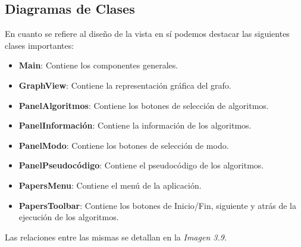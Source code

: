 \documentclass{book}
\begin{document}
\subsection{Diagramas de Clases}

En cuanto se refiere al diseño de la vista en sí podemos destacar las siguientes clases importantes:
\medskip

	\begin{itemize}
		\renewcommand{\labelitemi}{\scriptsize\tiny$\blacksquare$} 
		\itemsep=10pt \topsep=0pt \partopsep=0pt \parskip=0pt \parsep=10pt
		
		\item \textbf{Main}: Contiene los componentes generales.
		
		\item \textbf{GraphView}: Contiene la representación gráfica del grafo. 
		
		\item \textbf{PanelAlgoritmos}: Contiene los botones de selección de algoritmos.
		
		\item \textbf{PanelInformación}: Contiene la información de los algoritmos.
		
		\item \textbf{PanelModo}: Contiene los botones de selección de modo.
		
		\item \textbf{PanelPseudocódigo}: Contiene el pseudocódigo de los algoritmos.
		
		\item \textbf{PapersMenu}: Contiene el menú de la aplicación.
		
		\item \textbf{PapersToolbar}: Contiene los botones de Inicio/Fin, siguiente y atrás de la ejecución de los algoritmos.

	\end{itemize}
	\medskip

Las relaciones entre las mismas se detallan en la \textit{Imagen 3.9}.

\newpage
\end{document}
